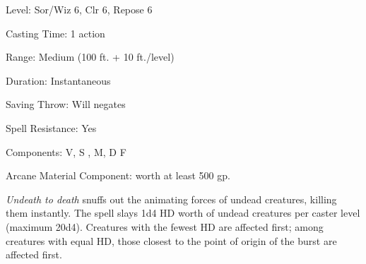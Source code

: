 
\begin{description*}
\item[Level:] Sor/Wiz 6, Clr 6, Repose 6
\item[Casting Time:] 1 action
\item[Range:] Medium (100 ft. + 10 ft./level)
\item[Duration:] Instantaneous
\item[Saving Throw:] Will negates
\item[Spell Resistance:] Yes
\item[Components:] V, S , M, D F
\item[Arcane Material Component:] worth at least 500 gp.
\end{description*}

\textit{Undeath to death} snuffs out the animating forces of undead creatures,
killing them instantly. The spell slays 1d4 HD worth of undead creatures per caster
level (maximum 20d4). Creatures with the fewest HD are affected first; among creatures
with equal HD, those closest to the point of origin of the burst are affected first.